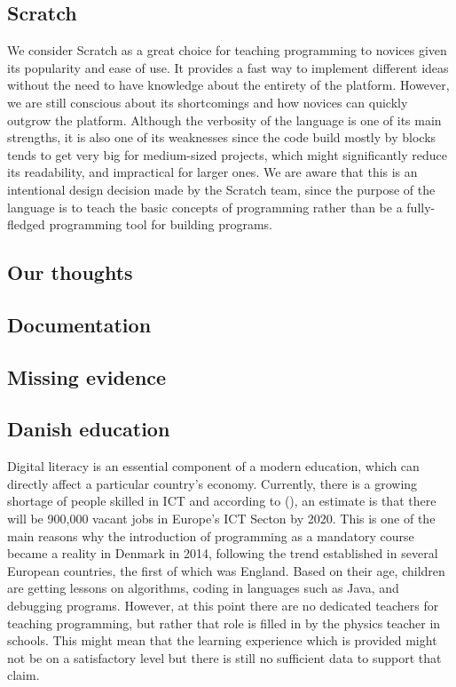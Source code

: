 \subsection{Scratch}
We consider Scratch as a great choice for teaching programming to novices given its popularity and ease of use. It provides a fast way to implement different ideas without the need to have knowledge about the entirety of the platform. However, we are still conscious about its shortcomings and how novices can quickly outgrow the platform. Although the verbosity of the language is one of its main strengths, it is also one of its weaknesses since the code build mostly by blocks tends to get very big for medium-sized projects, which might significantly reduce its readability, and impractical for larger ones. We are aware that this is an intentional design decision made by the Scratch team, since the purpose of the language is to teach the basic concepts of programming rather than be a fully-fledged programming tool for building programs. 
\subsection{Our thoughts}
\subsection{Documentation}
\subsection{Missing evidence}
\subsection{Danish education}
Digital literacy is an essential component of a modern education, which can directly affect a particular country's economy. Currently, there is a growing shortage of people skilled in ICT and according to (), an estimate is that there will be 900,000 vacant jobs in Europe's ICT Secton by 2020. This is one of the main reasons why the introduction of programming as a mandatory course became a reality in Denmark in 2014, following the trend established in several European countries, the first of which was England. Based on their age, children are getting lessons on algorithms, coding in languages such as Java, and debugging programs. However, at this point there are no dedicated teachers for teaching programming, but rather that role is filled in by the physics teacher in schools. This might mean that the learning experience which is provided might not be on a satisfactory level but there is still no sufficient data to support that claim.



